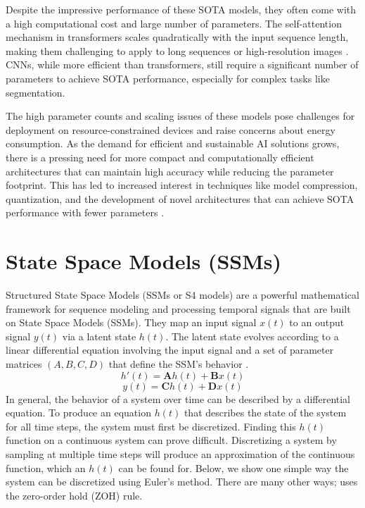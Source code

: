 \documentclass[conference]{IEEEtran}
\begin{document}
Despite the impressive performance of these SOTA models, they often come with a high computational cost and large number of parameters. The self-attention mechanism in transformers scales quadratically with the input sequence length, making them challenging to apply to long sequences or high-resolution images \cite{choromanski2020rethinking}. CNNs, while more efficient than transformers, still require a significant number of parameters to achieve SOTA performance, especially for complex tasks like segmentation.

The high parameter counts and scaling issues of these models pose challenges for deployment on resource-constrained devices and raise concerns about energy consumption. As the demand for efficient and sustainable AI solutions grows, there is a pressing need for more compact and computationally efficient architectures that can maintain high accuracy while reducing the parameter footprint. This has led to increased interest in techniques like model compression, quantization, and the development of novel architectures that can achieve SOTA performance with fewer parameters \cite{cheng2017survey, hinton2015distilling}.


\section{State Space Models (SSMs)}
Structured State Space Models (SSMs or S4 models) are a powerful mathematical framework for sequence modeling and processing temporal signals that are built on State Space Models (SSMs). They map an input signal $x(t)$ to an output signal $y(t)$ via a latent state $h(t)$. The latent state evolves according to a linear differential equation involving the input signal and a set of parameter matrices $(A, B, C, D)$ that define the SSM's behavior \cite{gu2022efficiently}.
\begin{equation}\label{eq:SSMlatent}
    h'(t) = \mathbf{A}h(t) + \mathbf{B}x(t)
\end{equation}
\begin{equation}\label{eq:SSMoutput}
    y(t) = \mathbf{C}h(t) + \mathbf{D}x(t)
\end{equation}
In general, the behavior of a system over time can be described by a differential equation. To produce an equation $h(t)$ that describes the state of the system for all time steps, the system must first be discretized. Finding this $h(t)$ function on a continuous system can prove difficult. Discretizing a system by sampling at multiple time steps will produce an approximation of the continuous function, which an $h(t)$ can be found for. Below, we show one simple way the system can be discretized using Euler's method. There are many other ways; \cite{gu2023mamba} uses the zero-order hold (ZOH) rule.
\end{document}
